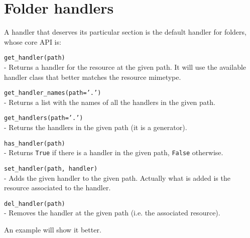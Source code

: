 \chapter{Folder handlers}

A handler that deserves its particular section is the default handler for
folders, whose core API is:

\begin{api}
  {\tt get\_handler(path)}\\
  - Returns a handler for the resource at the given path. It will use the
    available handler class that better matches the resource mimetype.

  {\tt get\_handler\_names(path='.')}\\
  - Returns a list with the names of all the handlers in the given path.

  {\tt get\_handlers(path='.')}\\
  - Returns the handlers in the given path (it is a generator).

  {\tt has\_handler(path)}\\
  - Returns {\tt True} if there is a handler in the given path, {\tt False}
    otherwise.

  {\tt set\_handler(path, handler)}\\
  - Adds the given handler to the given path. Actually what is added is
    the resource associated to the handler.

  {\tt del\_handler(path)}\\
  - Removes the handler at the given path (i.e. the associated resource).
\end{api}

An example will show it better.


